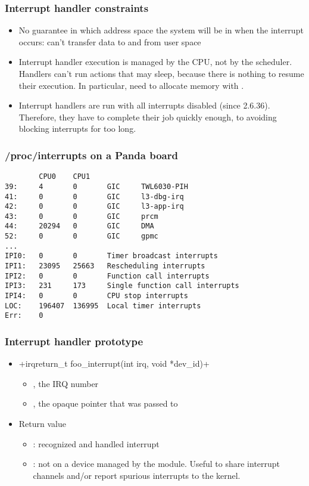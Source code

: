 \begin{frame}
  \frametitle{Interrupt handler constraints}
  \begin{itemize}
  \item No guarantee in which address space the system will be in when
    the interrupt occurs: can't transfer data to and from user space
  \item Interrupt handler execution is managed by the CPU, not by the
    scheduler.  Handlers can't run actions that may sleep, because
    there is nothing to resume their execution. In particular, need to
    allocate memory with .
  \item Interrupt handlers are run with all interrupts disabled (since
    2.6.36).  Therefore, they have to complete their job quickly
    enough, to avoiding blocking interrupts for too long.
  \end{itemize}
\end{frame}

\begin{frame}[fragile]
  \frametitle{/proc/interrupts on a Panda board}
\begin{verbatim}
        CPU0    CPU1
39:     4       0       GIC     TWL6030-PIH
41:     0       0       GIC     l3-dbg-irq
42:     0       0       GIC     l3-app-irq
43:     0       0       GIC     prcm
44:     20294   0       GIC     DMA
52:     0       0       GIC     gpmc
...
IPI0:   0       0       Timer broadcast interrupts
IPI1:   23095   25663   Rescheduling interrupts
IPI2:   0       0       Function call interrupts
IPI3:   231     173     Single function call interrupts
IPI4:   0       0       CPU stop interrupts
LOC:    196407  136995  Local timer interrupts
Err:    0
\end{verbatim}
\end{frame}

\begin{frame}[fragile]
  \frametitle{Interrupt handler prototype}
  \begin{itemize}
  \item {}+irqreturn_t foo_interrupt(int irq, void *dev_id)+
    \begin{itemize}
    \item {}, the IRQ number
    \item {}, the opaque pointer that was passed to
    \end{itemize}
  \item Return value
    \begin{itemize}
    \item {}: recognized and handled interrupt
    \item {}: not on a device managed by the
      module. Useful to share interrupt channels and/or report
      spurious interrupts to the kernel.
    \end{itemize}
  \end{itemize}
\end{frame}

